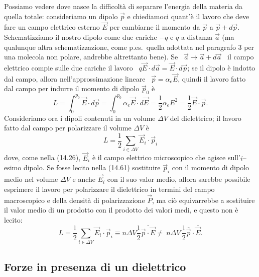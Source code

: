 Possiamo vedere dove nasce la difficolt\`a di separare l'energia della materia
da quella totale: consideriamo un dipolo $\vec p$ e chiediamoci quant'\`e il
lavoro che deve fare un campo elettrico esterno $\vec E$ per cambiarne il
momento da $\vec p$ a $\vec p+d\vec p$.\\
Schematizziamo il nostro dipolo come due cariche $-q$ e $q$ a distanza $\vec a$
(ma qualunque altra schematizzazione, come p.es.\ quella adottata nel paragrafo
3 per una molecola
non polare, andrebbe altrettanto bene). Se \ $\vec a\to\vec a+d\vec a$ \ il
campo elettrico compie sulle due cariche il lavoro
\ $q\vec E\cdot d\vec a=\vec E\cdot d\vec p$; se il dipolo \`e indotto dal
campo, allora nell'approssimazione lineare \ $\vec p=\alpha_e\vec E$, quindi il
lavoro fatto dal campo per indurre il momento di dipolo $\vec p_0$ \`e
\begin{equation}
  L=\int_0^{p_0}\vec E\cdot d\vec p=\int_0^{p_0}\alpha_e\vec E\cdot d\vec E
  =\frac{1}{2}\alpha_eE^2=\frac{1}{2}\vec E\cdot\vec p.
  \tag{14.60}
\end{equation}
Consideriamo ora i dipoli contenuti in un volume $\Delta V$ del dielettrico; il
lavoro fatto dal campo per polarizzare il volume $\Delta V$ \`e
\begin{equation}
  L=\frac{1}{2}\sum_{i\in\Delta V}\vec E_i\cdot\vec p_i
  \tag{14.61}
\end{equation}
dove, come nella (14.26), $\vec E_i$ \`e il campo elettrico microscopico che
agisce sull'$i$--esimo dipolo. Se fosse lecito nella (14.61) sostituire
$\vec p_i$ con il momento di dipolo medio nel volume $\Delta V$ e anche
$\vec E_i$ con il suo valor medio, allora sarebbe possibile esprimere il lavoro
per polarizzare il dielettrico in termini del campo macroscopico e della
densit\`a di polarizzazione $\vec P$, ma ci\`o equivarrebbe a sostituire il
valor medio di un prodotto con il prodotto dei valori medi, e questo non \`e
lecito:
\[
  L=\frac{1}{2}\sum_{i\in\Delta V}\vec E_i\cdot\vec p_i
  \equiv n\Delta V\frac{1}{2}\overline{\vec p\cdot\vec E}
  \ne\ n\Delta V\,\frac{1}{2}\overline{\vec p}\cdot\overline{\vec E}.
\]

\subsection{Forze in presenza di un dielettrico}

